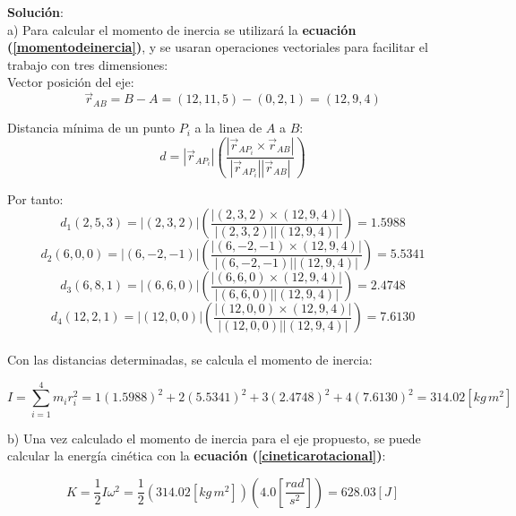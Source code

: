 \documentclass[letter,oneside,11pt]{article}
\begin{document}
\begin{minipage}[b]{.9\linewidth}
\textbf{Solución}:\\
a) Para calcular el momento de inercia se utilizará la \textbf{ecuación
(\ref{momentodeinercia})}, y se usaran operaciones vectoriales para facilitar el
trabajo con tres dimensiones: \\

Vector posición del eje:
\begin{equation*}
    \vec{r}_{AB} = B - A = (12,11,5) - (0,2,1) = (12,9,4)
\end{equation*}

Distancia mínima de un punto $P_i$ a la linea de $A$ a $B$:
\begin{equation*}
    d = | \vec{r}_{AP_i} | \left(\frac{| \vec{r}_{AP_i} \times \vec{r}_{AB} |}{|\vec{r}_{AP_i}| |\vec{r}_{AB}|} \right)
\end{equation*}

Por tanto: \\
\begin{equation*}
    d_1(2,5,3) = |(2,3,2)| \left(\frac{|(2,3,2)\times(12,9,4)|}{|(2,3,2)||(12,9,4)|}\right) = 1.5988
\end{equation*}
\begin{equation*}
    d_2(6,0,0) = |(6,-2,-1)| \left(\frac{|(6,-2,-1)\times(12,9,4)|}{|(6,-2,-1)||(12,9,4)|}\right) = 5.5341
\end{equation*}
\begin{equation*} 
    d_3(6,8,1) = |(6,6,0)| \left(\frac{|(6,6,0)\times(12,9,4)|}{|(6,6,0)||(12,9,4)|}\right) = 2.4748
\end{equation*}
\begin{equation*}
    d_4(12,2,1) = |(12,0,0)| \left(\frac{|(12,0,0)\times(12,9,4)|}{|(12,0,0)||(12,9,4)|}\right) = 7.6130
\end{equation*}
\\

Con las distancias determinadas, se calcula el momento de inercia:
\end{minipage}

\begin{minipage}[b]{.9\linewidth}
\begin{equation*}
    I = \sum_{i=1}^{4} m_i r^2_i = 1 (1.5988)^2 + 2 (5.5341)^2 + 3 (2.4748)^2 + 4 (7.6130)^2 = 314.02 [kg\, m^2]
\end{equation*}

b) Una vez calculado el momento de inercia para el eje propuesto, se puede
calcular la energía cinética con la \textbf{ecuación
(\ref{cineticarotacional})}:

\begin{equation*}
    K = \frac{1}{2} I \omega^2 =  \frac{1}{2} (314.02 [kg\, m^2]) \left(4.0 \left[\frac{rad}{s^2}\right]\right) = 628.03 [J]
\end{equation*}
\end{minipage}
\end{document}
